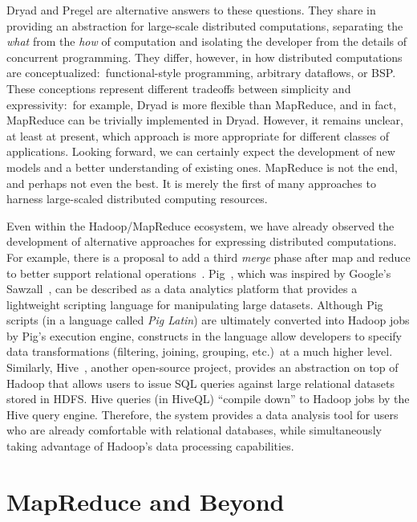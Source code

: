Dryad and Pregel are alternative answers to these questions.  They
share in providing an abstraction for large-scale distributed
computations, separating the \emph{what} from the \emph{how} of
computation and isolating the developer from the details of concurrent
programming.  They differ, however, in how distributed computations
are conceptualized:\ functional-style programming, arbitrary
dataflows, or BSP.  These conceptions represent different tradeoffs
between simplicity and expressivity:\ for example, Dryad is more
flexible than MapReduce, and in fact, MapReduce can be trivially
implemented in Dryad.  However, it remains unclear, at least at
present, which approach is more appropriate for different classes of
applications.  Looking forward, we can certainly expect the
development of new models and a better understanding of existing ones.
MapReduce is not the end, and perhaps not even the best.  It is merely
the first of many approaches to harness large-scaled distributed
computing resources.

Even within the Hadoop/MapReduce ecosystem, we have already observed
the development of alternative approaches for expressing distributed
computations.  For example, there is a proposal to add a third \emph{
  merge} phase after map and reduce to better support relational
operations~\cite{YangHungchih_etal_SIGMOD2007}.
Pig~\cite{Olston_etal_SIGMOD2008}, which was inspired by Google's
Sawzall~\cite{Pike_etal_2005}, can be described as a data analytics
platform that provides a lightweight scripting language for
manipulating large datasets.  Although Pig scripts (in a language
called \emph{Pig Latin}) are ultimately converted into Hadoop jobs by
Pig's execution engine, constructs in the language allow developers to
specify data transformations (filtering, joining, grouping, etc.)\ at
a much higher level.  Similarly, Hive~\cite{Hammerbacher_2009},
another open-source project, provides an abstraction on top of Hadoop
that allows users to issue SQL queries against large relational
datasets stored in HDFS.  Hive queries (in HiveQL) ``compile down'' to
Hadoop jobs by the Hive query engine.  Therefore, the system provides
a data analysis tool for users who are already comfortable with
relational databases, while simultaneously taking advantage of
Hadoop's data processing capabilities.

\section{MapReduce and Beyond}
\label{chapter-conclusion:end}

